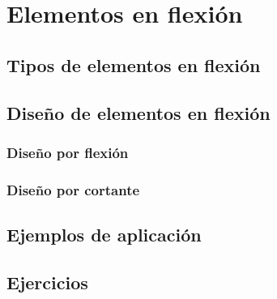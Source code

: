%
%

\chapter{Elementos en flexión}
\section{Tipos de elementos en flexión}
\section{Diseño de elementos en flexión}
\subsection{Diseño por flexión}
\subsection{Diseño por cortante}
\section{Ejemplos de aplicación}
\section{Ejercicios}